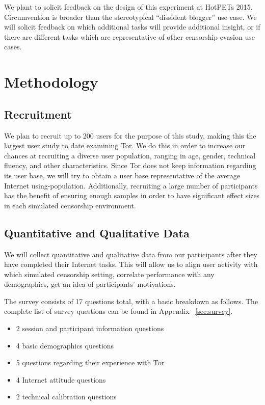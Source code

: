 \documentclass[letterpaper,twocolumn,11pt]{article}
\begin{document}
We plant to solicit feedback on the design of this experiment at HotPETs 2015. 
Circumvention is broader than the stereotypical ``dissident blogger'' 
use case. We will solicit feedback on which additional tasks will provide additional insight,
or if there are different tasks which are representative of other censorship evasion use cases.

\section{Methodology}  

\subsection{Recruitment}  
\indent \indent We plan to recruit up to 200 users for the purpose of this study, making this the largest user 
study to date examining Tor. We do this in order to increase our chances at recruiting a diverse
user population, ranging in age, gender, technical fluency, and other characteristics. Since Tor 
does not keep information regarding its user base, we will try to obtain a user base representative of
the average Internet using-population. Additionally, recruiting a large number of participants has the 
benefit of ensuring enough samples in order to have significant effect sizes in 
each simulated censorship environment. 

\subsection{Quantitative and Qualitative Data}   
\indent \indent We will collect quantitative and qualitative data from our participants after they have completed 
their Internet tasks. This will allow us to align user activity with which simulated censorship setting, 
correlate performance with any demographics, get an idea of participants' motivations. 

The survey consists of 17 questions total, with a basic breakdown as follows. 
The complete list of survey questions can be found in Appendix ~\ref{sec:survey}.

\begin{itemize} \itemsep1pt \parskip0pt 
\item 2 session and participant information questions
\item 4 basic demographics questions
\item 5 questions regarding their experience with Tor
\item 4 Internet attitude questions
\item 2 technical calibration questions
\end{itemize}
\end{document}
